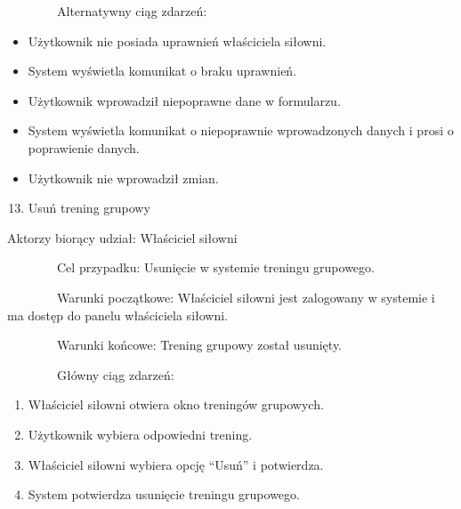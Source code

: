\documentclass[
]{article}
\providecommand{\tightlist}{%
  \setlength{\itemsep}{0pt}\setlength{\parskip}{0pt}}
\begin{document}
{~~~~~~~~Alternatywny ciąg zdarzeń:}

\begin{itemize}
\tightlist
\item
  {Użytkownik nie posiada uprawnień właściciela siłowni.}
\end{itemize}

\begin{itemize}
\tightlist
\item
  {System wyświetla komunikat o braku uprawnień.}
\end{itemize}

\begin{itemize}
\tightlist
\item
  {Użytkownik wprowadził niepoprawne dane w formularzu.}
\end{itemize}

\begin{itemize}
\tightlist
\item
  {System wyświetla komunikat o niepoprawnie wprowadzonych danych i
  prosi o poprawienie danych.}
\end{itemize}

\begin{itemize}
\tightlist
\item
  {Użytkownik nie wprowadził zmian.}
\end{itemize}

{\hfill\break
}

\begin{enumerate}
\setcounter{enumi}{12}
\tightlist
\item
  {Usuń trening grupowy}
\end{enumerate}

{Aktorzy biorący udział: Właściciel siłowni}

{~~~~~~~~Cel przypadku: Usunięcie w systemie treningu grupowego.}

{~~~~~~~~Warunki początkowe: Właściciel siłowni jest zalogowany w
systemie i ma dostęp do panelu właściciela siłowni.}

{~~~~~~~~Warunki końcowe: Trening grupowy został usunięty.}

{~~~~~~~~Główny ciąg zdarzeń:}

\begin{enumerate}
\tightlist
\item
  {Właściciel siłowni otwiera okno treningów grupowych.}
\item
  {Użytkownik wybiera odpowiedni trening.}
\item
  {Właściciel siłowni wybiera opcję ``Usuń'' i potwierdza.}
\item
  {System potwierdza usunięcie treningu grupowego.}
\end{enumerate}
\end{document}
